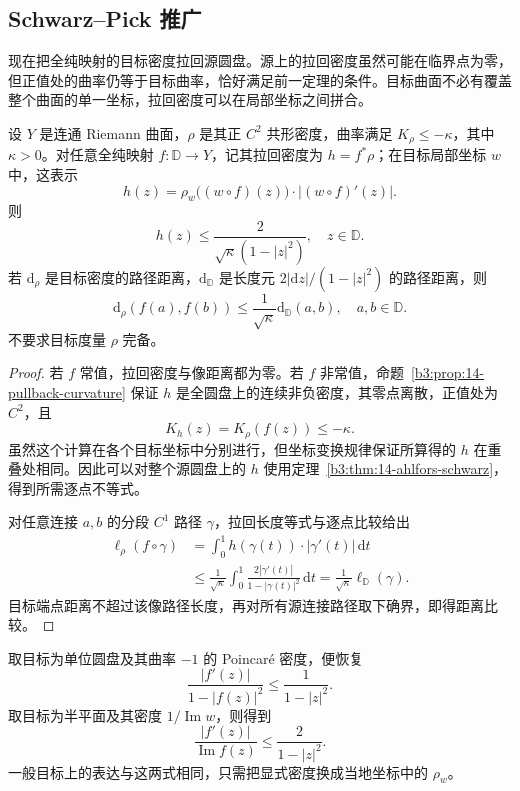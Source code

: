 \subsection{Schwarz–Pick 推广}
\label{b3:subsec:140202}

现在把全纯映射的目标密度拉回源圆盘。源上的拉回密度虽然可能在临界点为零，但正值处的曲率仍等于目标曲率，恰好满足前一定理的条件。目标曲面不必有覆盖整个曲面的单一坐标，拉回密度可以在局部坐标之间拼合。

\begin{corollary}\label{b3:cor:14-schwarz-negative-target}
设 \(Y\) 是连通 Riemann 曲面，\(\rho\) 是其正 \(C^2\) 共形密度，曲率满足 \(K_\rho\le-\kappa\)，其中 \(\kappa>0\)。对任意全纯映射 \(f:\mathbb D\to Y\)，记其拉回密度为 \(h=f^*\rho\)；在目标局部坐标 \(w\) 中，这表示
\[
 h(z)=\rho_w\bigl((w\circ f)(z)\bigr)
 \cdot|(w\circ f)'(z)|.
\]
则
\[
 h(z)\le\frac{2}{\sqrt\kappa(1-|z|^2)},
 \quad z\in\mathbb D.
\]
若 \(\mathrm d_\rho\) 是目标密度的路径距离，\(\mathrm d_{\mathbb D}\) 是长度元 \(2|\mathrm dz|/(1-|z|^2)\) 的路径距离，则
\[
 \mathrm d_\rho(f(a),f(b))
 \le\frac{1}{\sqrt\kappa}\mathrm d_{\mathbb D}(a,b),
 \quad a,b\in\mathbb D.
\]
不要求目标度量 \(\rho\) 完备。
\end{corollary}
\begin{proof}
若 \(f\) 常值，拉回密度与像距离都为零。若 \(f\) 非常值，命题~\ref{b3:prop:14-pullback-curvature} 保证 \(h\) 是全圆盘上的连续非负密度，其零点离散，正值处为 \(C^2\)，且
\[
 K_h(z)=K_\rho(f(z))\le-\kappa.
\]
虽然这个计算在各个目标坐标中分别进行，但坐标变换规律保证所算得的 \(h\) 在重叠处相同。因此可以对整个源圆盘上的 \(h\) 使用定理~\ref{b3:thm:14-ahlfors-schwarz}，得到所需逐点不等式。

对任意连接 \(a,b\) 的分段 \(C^1\) 路径 \(\gamma\)，拉回长度等式与逐点比较给出
\[
 \begin{aligned}
 \ell_\rho(f\circ\gamma)
 &=\int_0^1h(\gamma(t))\cdot|\gamma'(t)|\,\mathrm dt\\
 &\le\frac{1}{\sqrt\kappa}
 \int_0^1\frac{2|\gamma'(t)|}{1-|\gamma(t)|^2}\,\mathrm dt
 =\frac{1}{\sqrt\kappa}\ell_{\mathbb D}(\gamma).
 \end{aligned}
\]
目标端点距离不超过该像路径长度，再对所有源连接路径取下确界，即得距离比较。
\end{proof}

取目标为单位圆盘及其曲率 \(-1\) 的 Poincaré 密度，便恢复
\[
 \frac{|f'(z)|}{1-|f(z)|^2}\le\frac{1}{1-|z|^2}.
\]
取目标为半平面及其密度 \(1/\operatorname{Im}w\)，则得到
\[
 \frac{|f'(z)|}{\operatorname{Im}f(z)}\le\frac{2}{1-|z|^2}.
\]
一般目标上的表达与这两式相同，只需把显式密度换成当地坐标中的 \(\rho_w\)。

